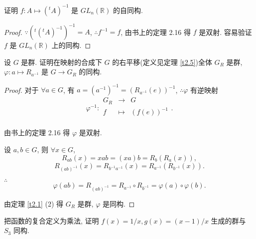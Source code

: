 \documentclass[color=black,device=normal,lang=cn,mode=geye]{elegantnote}
\begin{document}
\begin{exercisec}[5.2.26]
    证明 $f:A\mapsto({}^tA)^{-1}$ 是 $ GL_n(\mathbb{R})$ 的自同构.
\end{exercisec}
\begin{proof}
    $\because({}^t({}^tA)^{-1})^{-1}=A$, $\therefore f^{-1}=f$, 由书上的定理 2.16 得 $f$ 是双射. 容易验证 $f$ 是 $ GL_n(\mathbb{R})$ 上的同构.
\end{proof}
\begin{exercisec}[5.2.27]\label{exc5.2.27}
    设 $G$ 是群. 证明在映射的合成下 $G$ 的右平移(定义见定理 \ref{t2.5})全体 $G_R$ 是群, $\varphi:a\mapsto R_{a^{-1}}$ 是 $G\to G_R$ 的同构.
\end{exercisec}
\begin{proof}
    对于 $\forall a\in G$, 有 $a=(a^{-1})^{-1}=(R_{a^{-1}}(e))^{-1}$, $\therefore\varphi$ 有逆映射
    \[\varphi^{-1}:\begin{array}{rcl}
        G_R & \to & G \\
        f & \mapsto & (f(e))^{-1} \\
    \end{array}.\]

    由书上的定理 2.16 得 $\varphi$ 是双射.

    设 $a,b\in G$, 则 $\forall x\in G$,
    \[R_{ab}(x)=xab=(xa)b=R_b(R_a(x)),\]
    \[R_{(ab)^{-1}}(x)=R_{b^{-1}a^{-1}}(x)=R_{a^{-1}}(R_{b^{-1}}(x)).\]

    $\therefore$
    \[\varphi(ab)=R_{(ab)^{-1}}=R_{a^{-1}}\circ R_{b^{-1}}=\varphi(a)\circ\varphi(b).\]

    由定理 \ref{t2.1} (2) 得 $G_R$ 是群, $\varphi$ 是同构.
\end{proof}
\begin{exercisec}[5.2.28]\label{exc5.2.28}
    把函数的复合定义为乘法, 证明 $f(x)=1/x,g(x)=(x-1)/x$ 生成的群与 $S_3$ 同构.
\end{exercisec}
\end{document}
